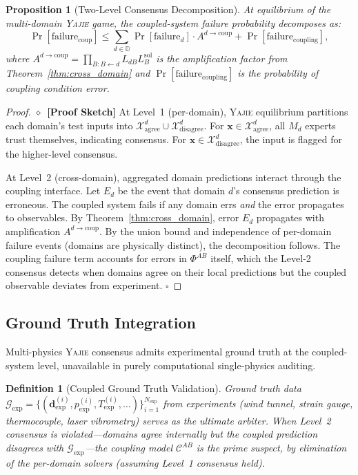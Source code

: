 \documentclass[11pt,a4paper]{article}
\newtheorem{proposition}[theorem]{Proposition}
\newtheorem{definition}[theorem]{Definition}
\theoremstyle{definition}
\newcommand{\rigorSketch}[0]{$\diamond$~\textbf{[Proof Sketch]}}
\newcommand{\Yajie}{\textsc{Yajie}}
\newcommand{\domains}{\mathbb{D}}
\begin{document}
\begin{proposition}[Two-Level Consensus Decomposition]\label{prop:two_level}
At equilibrium of the multi-domain \Yajie{} game, the coupled-system failure probability decomposes as:
\begin{equation}\label{eq:two_level_decomp}
\Pr[\text{failure}_{\mathrm{coup}}] \leq \sum_{d \in \domains} \Pr[\text{failure}_d] \cdot A^{d \to \mathrm{coup}} + \Pr[\text{failure}_{\mathrm{coupling}}],
\end{equation}
where $A^{d \to \mathrm{coup}} = \prod_{B: B \leftarrow d} L_{dB} L_B^{\mathrm{sol}}$ is the amplification factor from Theorem~\ref{thm:cross_domain} and $\Pr[\text{failure}_{\mathrm{coupling}}]$ is the probability of coupling condition error.
\end{proposition}

\begin{proof}\rigorSketch
At Level~1 (per-domain), \Yajie{} equilibrium partitions each domain's test inputs into $\mathcal{X}_{\mathrm{agree}}^d \cup \mathcal{X}_{\mathrm{disagree}}^d$. For $\mathbf{x} \in \mathcal{X}_{\mathrm{agree}}^d$, all $M_d$ experts trust themselves, indicating consensus. For $\mathbf{x} \in \mathcal{X}_{\mathrm{disagree}}^d$, the input is flagged for the higher-level consensus.

At Level~2 (cross-domain), aggregated domain predictions interact through the coupling interface. Let $E_d$ be the event that domain $d$'s consensus prediction is erroneous. The coupled system fails if any domain errs \textit{and} the error propagates to observables. By Theorem~\ref{thm:cross_domain}, error $E_d$ propagates with amplification $A^{d \to \mathrm{coup}}$. By the union bound and independence of per-domain failure events (domains are physically distinct), the decomposition follows. The coupling failure term accounts for errors in $\Phi^{AB}$ itself, which the Level-2 consensus detects when domains agree on their local predictions but the coupled observable deviates from experiment. $\square$
\end{proof}

\subsection{Ground Truth Integration }

Multi-physics \Yajie{} consensus admits experimental ground truth at the coupled-system level, unavailable in purely computational single-physics auditing.

\begin{definition}[Coupled Ground Truth Validation]\label{def:ground_truth}
Ground truth data $\mathcal{G}_{\mathrm{exp}} = \{( \mathbf{d}_{\mathrm{exp}}^{(i)}, p_{\mathrm{exp}}^{(i)}, T_{\mathrm{exp}}^{(i)}, \ldots )\}_{i=1}^{N_{\mathrm{exp}}}$ from experiments (wind tunnel, strain gauge, thermocouple, laser vibrometry) serves as the ultimate arbiter. When Level~2 consensus is violated---domains agree internally but the coupled prediction disagrees with $\mathcal{G}_{\mathrm{exp}}$---the coupling model $\mathcal{C}^{AB}$ is the prime suspect, by elimination of the per-domain solvers (assuming Level~1 consensus held).
\end{definition}
\end{document}
